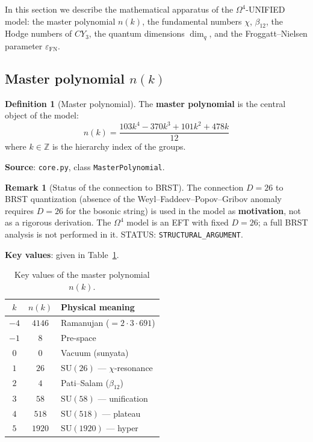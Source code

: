 \documentclass[11pt,a4paper]{article}
\newcommand{\SU}{\ensuremath{\mathrm{SU}}}
\newcommand{\CY}{\ensuremath{CY_3}}
\newcommand{\Om}{\ensuremath{\Omega^4}}
\newcommand{\epsFN}{\ensuremath{\varepsilon_{\text{FN}}}}
\theoremstyle{definition}
\newtheorem{definition}[theorem]{Definition}
\newtheorem{remark}[theorem]{Remark}
\begin{document}
In this section we describe the mathematical apparatus of the $\Om$-UNIFIED
model: the master polynomial $n(k)$, the fundamental numbers $\chi$, $\beta_{12}$,
the Hodge numbers of $\CY$, the quantum dimensions $\dim_q$, and the
Froggatt--Nielsen parameter $\epsFN$.

\subsection{Master polynomial \texorpdfstring{$n(k)$}{n(k)}}
\label{subsec:master-poly}

\begin{definition}[Master polynomial]
\label{def:master-poly}
The \textbf{master polynomial} is the central object of the model:
\begin{equation}
    \boxed{
    n(k) = \frac{103 k^4 - 370 k^3 + 101 k^2 + 478 k}{12}
    }
    \label{eq:master-poly}
\end{equation}
where $k \in \mathbb{Z}$ is the hierarchy index of the groups.
\end{definition}

\textbf{Source}: \texttt{core.py}, class \texttt{MasterPolynomial}.

\begin{remark}[Status of the connection to BRST]
\label{rem:brst-status}
The connection $D = 26$ to BRST quantization
(absence of the Weyl--Faddeev--Popov--Gribov anomaly
requires $D = 26$ for the bosonic string)
is used in the model as \textbf{motivation}, not as a
rigorous derivation. The $\Om$ model is an EFT with fixed
$D = 26$; a full BRST analysis is not performed in it.
STATUS: \texttt{STRUCTURAL\_ARGUMENT}.
\end{remark}

\medskip\noindent
\textbf{Key values}: given in Table~\ref{tab:master-poly-values}.

\begin{table}[ht]
\centering
\caption{Key values of the master polynomial \texorpdfstring{$n(k)$}{n(k)}.}
\label{tab:master-poly-values}
\begin{tabular}{ccl}
\toprule
$k$ & $n(k)$ & Physical meaning \\
\midrule
$-4$ & $4146$ & Ramanujan ($= 2 \cdot 3 \cdot 691$) \\
$-1$ & $8$ & Pre-space \\
$0$ & $0$ & Vacuum (sunyata) \\
$1$ & $26$ & $\SU(26)$ --- $\chi$-resonance \\
$2$ & $4$ & Pati--Salam ($\beta_{12}$) \\
$3$ & $58$ & $\SU(58)$ --- unification \\
$4$ & $518$ & $\SU(518)$ --- plateau \\
$5$ & $1920$ & $\SU(1920)$ --- hyper \\
\bottomrule
\end{tabular}
\end{table}
\end{document}
